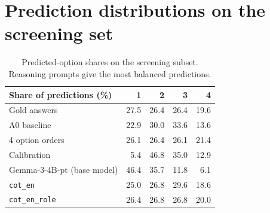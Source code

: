 \documentclass[10pt,a4paper]{article}
\newcommand{\cond}[1]{\texttt{#1}}
\begin{document}
\section{Prediction distributions on the screening set}
\begin{table}[h]
\centering\small
\begin{tabular}{lrrrr}
\toprule
Share of predictions (\%) & 1 & 2 & 3 & 4\\
\midrule
Gold answers & 27.5 & 26.4 & 26.4 & 19.6\\
A0 baseline & 22.9 & 30.0 & 33.6 & 13.6\\
4 option orders & 26.1 & 26.4 & 26.1 & 21.4\\
Calibration & 5.4 & 46.8 & 35.0 & 12.9\\
Gemma-3-4B-pt (base model) & 46.4 & 35.7 & 11.8 & 6.1\\
\cond{cot\_en} & 25.0 & 26.8 & 29.6 & 18.6\\
\cond{cot\_en\_role} & 26.4 & 26.8 & 26.8 & 20.0\\
\bottomrule
\end{tabular}
\caption{Predicted-option shares on the screening subset. Reasoning prompts give the most balanced predictions.}
\end{table}
\end{document}
